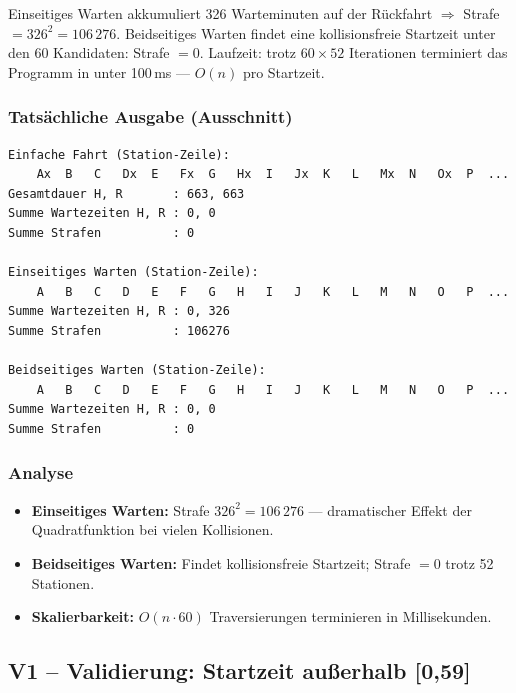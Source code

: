 \documentclass[12pt,a4paper]{article}
\begin{document}
Einseitiges Warten akkumuliert 326 Warteminuten auf der Rückfahrt $\Rightarrow$ Strafe $= 326^2 = 106\,276$.
Beidseitiges Warten findet eine kollisionsfreie Startzeit unter den 60 Kandidaten: Strafe $= 0$.
Laufzeit: trotz $60 \times 52$ Iterationen terminiert das Programm in unter 100\,ms — $O(n)$ pro Startzeit.

\subsubsection*{Tatsächliche Ausgabe (Ausschnitt)}
\begin{lstlisting}
Einfache Fahrt (Station-Zeile):
    Ax  B   C   Dx  E   Fx  G   Hx  I   Jx  K   L   Mx  N   Ox  P  ...
Gesamtdauer H, R       : 663, 663
Summe Wartezeiten H, R : 0, 0
Summe Strafen          : 0

Einseitiges Warten (Station-Zeile):
    A   B   C   D   E   F   G   H   I   J   K   L   M   N   O   P  ...
Summe Wartezeiten H, R : 0, 326
Summe Strafen          : 106276

Beidseitiges Warten (Station-Zeile):
    A   B   C   D   E   F   G   H   I   J   K   L   M   N   O   P  ...
Summe Wartezeiten H, R : 0, 0
Summe Strafen          : 0
\end{lstlisting}

\subsubsection*{Analyse}
\begin{itemize}
  \item \textbf{Einseitiges Warten:} Strafe $326^2 = 106\,276$ — dramatischer Effekt der Quadratfunktion bei vielen Kollisionen.
  \item \textbf{Beidseitiges Warten:} Findet kollisionsfreie Startzeit; Strafe $= 0$ trotz 52 Stationen.
  \item \textbf{Skalierbarkeit:} $O(n \cdot 60)$ Traversierungen terminieren in Millisekunden.
\end{itemize}

\subsection{V1 – Validierung: Startzeit außerhalb [0,59]}
\label{test:v1}
\end{document}
